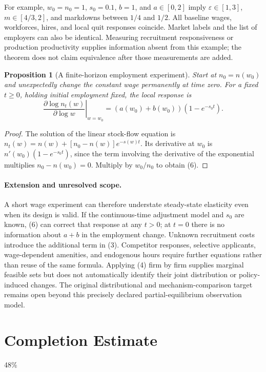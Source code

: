 \documentclass[11pt]{article}
\newtheorem{proposition}[theorem]{Proposition}
\theoremstyle{definition}
\begin{document}
For example, $w_0=n_0=1$, $s_0=0.1$, $b=1$, and $a\in[0,2]$ imply $\varepsilon\in[1,3]$, $m\in[4/3,2]$, and markdowns between $1/4$ and $1/2$. All baseline wages, workforces, hires, and local quit responses coincide. Market labels and the list of employers can also be identical. Measuring recruitment responsiveness or production productivity supplies information absent from this example; the theorem does not claim equivalence after those measurements are added.

\begin{proposition}[A finite-horizon employment experiment]
Start at $n_0=n(w_0)$ and unexpectedly change the constant wage permanently at time zero. For a fixed $t\geq0$, holding initial employment fixed, the local response is
\[
 \left.\frac{\partial\log n_t(w)}{\partial\log w}\right|_{w=w_0}
 =(a(w_0)+b(w_0))(1-e^{-s_0t}).
 \tag{6}
\]
\end{proposition}
\begin{proof}
The solution of the linear stock-flow equation is
$n_t(w)=n(w)+[n_0-n(w)]e^{-s(w)t}$. Its derivative at $w_0$ is $n'(w_0)(1-e^{-s_0t})$, since the term involving the derivative of the exponential multiplies $n_0-n(w_0)=0$. Multiply by $w_0/n_0$ to obtain (6).
\end{proof}

\paragraph{Extension and unresolved scope.}
A short wage experiment can therefore understate steady-state elasticity even when its design is valid. If the continuous-time adjustment model and $s_0$ are known, (6) can correct that response at any $t>0$; at $t=0$ there is no information about $a+b$ in the employment change. Unknown recruitment costs introduce the additional term in (3). Competitor responses, selective applicants, wage-dependent amenities, and endogenous hours require further equations rather than reuse of the same formula. Applying (4) firm by firm supplies marginal feasible sets but does not automatically identify their joint distribution or policy-induced changes. The original distributional and mechanism-comparison target remains open beyond this precisely declared partial-equilibrium observation model.

\section{Completion Estimate}
48\%
\end{document}
